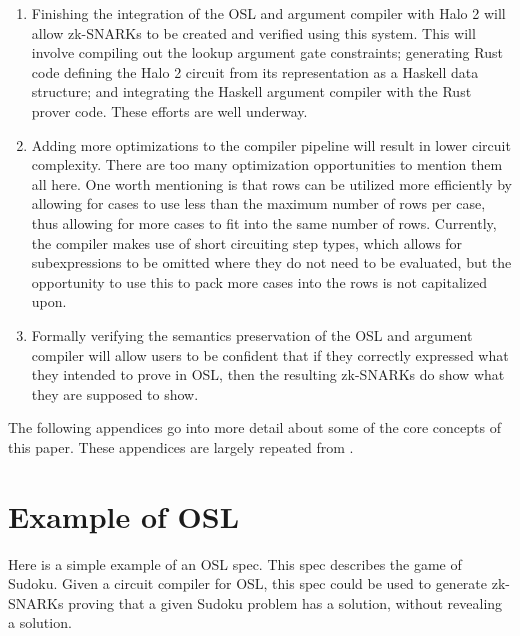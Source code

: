 \documentclass[11pt]{article}
\begin{document}
\begin{enumerate}
	\item Finishing the integration of the OSL and argument compiler with Halo 2 will allow zk-SNARKs to be created and verified using this system. This will involve compiling out the lookup argument gate constraints; generating Rust code defining the Halo 2 circuit from its representation as a Haskell data structure; and integrating the Haskell argument compiler with the Rust prover code. These efforts are well underway.
	\item Adding more optimizations to the compiler pipeline will result in lower circuit complexity. There are too many optimization opportunities to mention them all here. One worth mentioning is that rows can be utilized more efficiently by allowing for cases to use less than the maximum number of rows per case, thus allowing for more cases to fit into the same number of rows. Currently, the compiler makes use of short circuiting step types, which allows for subexpressions to be omitted where they do not need to be evaluated, but the opportunity to use this to pack more cases into the rows is not capitalized upon.
	\item Formally verifying the semantics preservation of the OSL and argument compiler will allow users to be confident that if they correctly expressed what they intended to prove in OSL, then the resulting zk-SNARKs do show what they are supposed to show.
\end{enumerate}

The following appendices go into more detail about some of the core concepts of this paper. These appendices are largely repeated from \cite{osl-paper,sigma11-poly-bounds}.

\appendix

\section{Example of OSL}

Here is a simple example of an OSL spec. This spec describes the game of
Sudoku. Given a circuit compiler for OSL, this spec could be used to
generate zk-SNARKs proving that a given Sudoku problem has a solution,
without revealing a solution.
\end{document}
